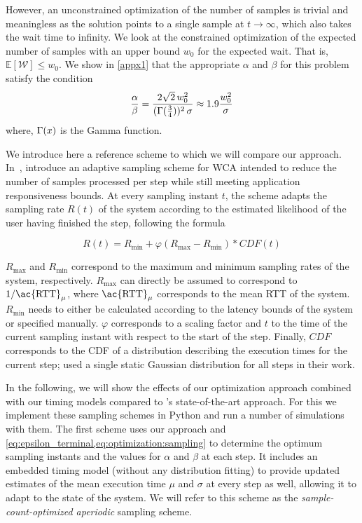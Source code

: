 However, an unconstrained optimization of the number of samples is trivial and meaningless as the solution points to a single sample at $t\!\rightarrow\!\infty$, which also takes the wait time to infinity.
We look at the constrained optimization of the expected number of samples with an upper bound $w_0$ for the expected wait.
That is, $\mathbb{E}[\mathcal{W}]\!\leq\!w_0$. We show in \cref{appx1} that the appropriate $\alpha$ and $\beta$ for this problem satisfy the condition
\begin{alignat}{1}\label{eq:optimization:sampling}
\frac{\alpha}{\beta}=\frac{2\sqrt{2}\,w_0^2}{(\mathlarger{\Gamma}(\tfrac{3}{4}))^2\,\sigma}\approx1.9\frac{w_0^2}{\sigma}
\end{alignat}
where, $\mathlarger{\Gamma}(x)$ is the Gamma function.

\medskip

We introduce here a reference scheme to which we will compare our approach.
In~\cite{Wang2019Towards}, \citeauthor{Wang2019Towards} introduce an adaptive sampling scheme for \ac{WCA} intended to reduce the number of samples processed per step while still meeting application responsiveness bounds.
At every sampling instant \( t \), the scheme adapts the sampling rate \( R(t) \) of the system according to the estimated likelihood of the user having finished the step,
following the formula 

\begin{equation}
    R(t) = R_\text{min} + \varphi\left( R_\text{max} - R_\text{min} \right) * CDF(t)
\end{equation}

\( R_\text{max} \) and \( R_\text{min} \) correspond to the maximum and minimum sampling rates of the system, respectively.
\( R_\text{max} \) can directly be assumed to correspond to \( 1 / \text{\ac{RTT}}_\mu \), where \( \text{\ac{RTT}}_\mu \) corresponds to the mean \ac{RTT} of the system.
\( R_\text{min} \) needs to either be calculated according to the latency bounds of the system or specified manually.
\( \varphi \) corresponds to a scaling factor and \( t \) to the time of the current sampling instant with respect to the start of the step.
Finally, \( CDF \) corresponds to the \ac{CDF} of a distribution describing the execution times for the current step; \citeauthor{Wang2019Towards} used a single static Gaussian distribution for all steps in their work.

\medskip

In the following, we will show the effects of our optimization approach combined with our timing models compared to \textcite{Wang2019Towards}'s state-of-the-art approach.
For this we implement these sampling schemes in Python and run a number of simulations with them.
The first scheme uses our approach and \cref{eq:epsilon_terminal,eq:optimization:sampling} to determine the optimum sampling instants and the values for \( \alpha \) and \( \beta \) at each step.
It includes an embedded timing model (without any distribution fitting) to provide updated estimates of the mean execution time \( \mu \) and \( \sigma \) at every step as well, allowing it to adapt to the state of the system.
We will refer to this scheme as the \emph{sample-count-optimized aperiodic} sampling scheme.

